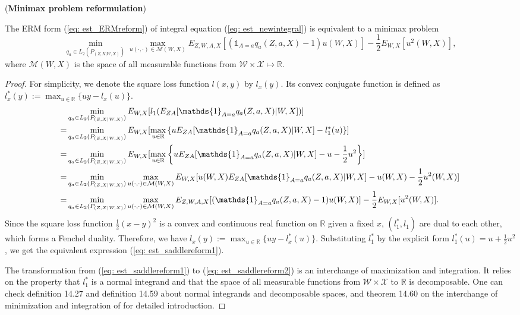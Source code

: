 \begin{lemma}(\textbf{Minimax problem reformulation})
    
    The ERM form (\ref{eq: est_ERMreform}) of integral equation (\ref{eq: est_newintegral}) is equivalent to a 
    minimax problem 
    \begin{equation}
        \label{eq: est_saddlereform}
        \min_{q_a\in L_2(P_{(Z,X|W,X)})} \max_{u(\cdot,\cdot)\in\mathcal{M}(W,X)} E_{Z,W,A,X}[(\mathds{1}_{A=a}q_a(Z,a,X)-1)u(W,X)]-\frac{1}{2}E_{W,X}[u^2(W,X)], 
    \end{equation} 
    where $\mathcal{M}(W,X)$ is the space of all measurable functions from $\mathcal{W}\times\mathcal{X}\mapsto\mathbb{R}$. 
\end{lemma}
\begin{proof}
    For simplicity, we denote the square loss function $l(x,y)$ by $l_x(y)$. 
    Its convex conjugate function is defined as $l_x^*(y):=\max_{u\in\mathbb{R}}\{uy-l_x(u)\}$.
    \begin{align}
         & \min_{q_a\in L_2(P_{(Z,X|W,X)})} E_{W,X}[l_1(E_{ZA}[\mathds{1}_{A=a}q_a(Z,a,X)|W,X])] \notag\\
        =& \min_{q_a\in L_2(P_{(Z,X|W,X)})} E_{W,X}[\max_{u\in\mathbb{R}}\left\{uE_{ZA}[\mathds{1}_{A=a}q_a(Z,a,X)|W,X]-l^*_1(u)\right\}] \notag\\                                                   
        =& \min_{q_a\in L_2(P_{(Z,X|W,X)})} E_{W,X}[\max_{u\in\mathbb{R}}\left\{uE_{ZA}[\mathds{1}_{A=a}q_a(Z,a,X)|W,X]-u-\frac{1}{2}u^2\right\}] \label{eq: est_saddlereform1}\\
        =& \min_{q_a\in L_2(P_{(Z,X|W,X)})} \max_{u(\cdot,\cdot)\in\mathcal{M}(W,X)} E_{W,X}[u(W,X)E_{ZA}[\mathds{1}_{A=a}q_a(Z,a,X)|W,X]-u(W,X)-\frac{1}{2}u^2(W,X)] \label{eq: est_saddlereform2}\\
        =& \min_{q_a\in L_2(P_{(Z,X|W,X)})} \max_{u(\cdot,\cdot)\in\mathcal{M}(W,X)} E_{Z,W,A,X}[(\mathds{1}_{A=a}q_a(Z,a,X)-1)u(W,X)]-\frac{1}{2}E_{W,X}[u^2(W,X)]. \notag
    \end{align}
    Since the square loss function $\frac{1}{2}(x-y)^2$ is a convex and continuous real function on $\mathbb{R}$ given a fixed $x$, 
    $(l_1^*,l_1)$ are dual to each other, 
    which forms a Fenchel duality\cite{rockafellar2009variational}. 
    Therefore, we have $l_x(y):=\max_{u\in\mathbb{R}}\{uy-l_x^*(u)\}$. 
    Substituting $l_1^*$ by the explicit form $l_1^*(u)=u+\frac{1}{2}u^2$, we get the equivalent expression (\ref{eq: est_saddlereform1}). 

    The transformation from (\ref{eq: est_saddlereform1}) to (\ref{eq: est_saddlereform2}) is 
    an interchange of maximization and integration. 
    It relies on the property that $l_1^*$ is a normal integrand 
    and that the space of all measurable functions from $\mathcal{W}\times\mathcal{X}$ to $\mathbb{R}$ is decomposable. 
    One can check definition 14.27 and definition 14.59 about normal integrands and decomposable spaces, 
    and theorem 14.60 on the interchange of minimization and integration of \cite{rockafellar2009variational} for detailed introduction. 
\end{proof}

